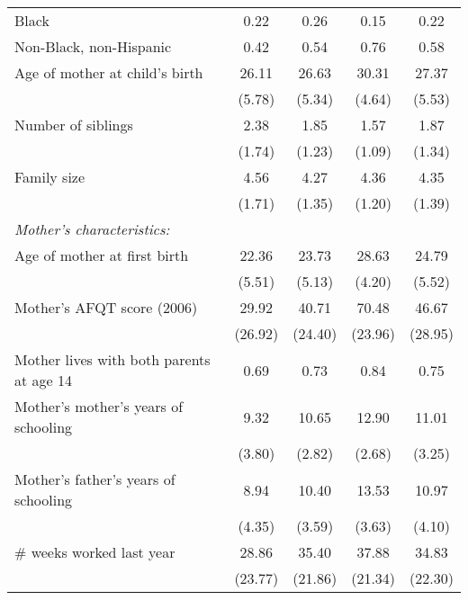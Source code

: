 \begin{table}[!t]
\begin{threeparttable}
\begin{tabular}{l*{4}{c}}
Black               &        0.22&        0.26&        0.15&        0.22\\

Non-Black, non-Hispanic&        0.42&        0.54&        0.76&        0.58\\

Age of mother at child's birth&       26.11&       26.63&       30.31&       27.37\\
                    &      (5.78)&      (5.34)&      (4.64)&      (5.53)\\

Number of siblings  &        2.38&        1.85&        1.57&        1.87\\
                    &      (1.74)&      (1.23)&      (1.09)&      (1.34)\\

Family size         &        4.56&        4.27&        4.36&        4.35\\
                    &      (1.71)&      (1.35)&      (1.20)&      (1.39)\\

\addlinespace
\textit{Mother's characteristics:} & & & & \\
\addlinespace
Age of mother at first birth&       22.36&       23.73&       28.63&       24.79\\
                    &      (5.51)&      (5.13)&      (4.20)&      (5.52)\\

Mother's AFQT score (2006)&       29.92&       40.71&       70.48&       46.67\\
                    &     (26.92)&     (24.40)&     (23.96)&     (28.95)\\

Mother lives with both parents at age 14&        0.69&        0.73&        0.84&        0.75\\

Mother's mother's years of schooling&        9.32&       10.65&       12.90&       11.01\\
                    &      (3.80)&      (2.82)&      (2.68)&      (3.25)\\

Mother's father's years of schooling&        8.94&       10.40&       13.53&       10.97\\
                    &      (4.35)&      (3.59)&      (3.63)&      (4.10)\\

$\#$ weeks worked last year&       28.86&       35.40&       37.88&       34.83\\
                    &     (23.77)&     (21.86)&     (21.34)&     (22.30)\\


\end{tabular}
\end{threeparttable}
\end{table}
